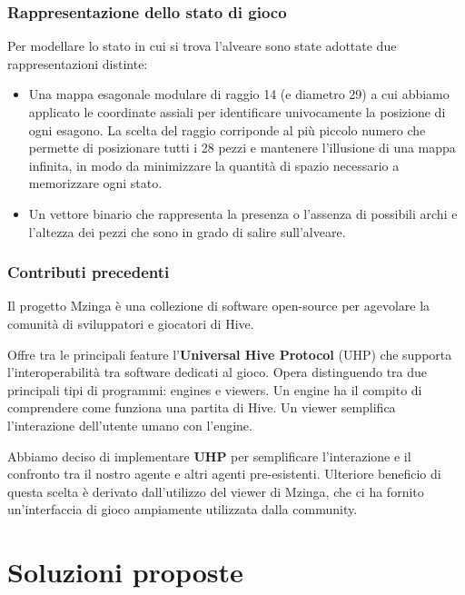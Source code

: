 \documentclass[a4paper,12pt]{article}
\begin{document}
    \newpage

    \subsubsection{Rappresentazione dello stato di gioco}
    Per modellare lo stato in cui si trova l'alveare sono state adottate due rappresentazioni distinte:
    \begin{itemize}
        \item Una mappa esagonale modulare di raggio 14 (e diametro 29) a cui abbiamo applicato le coordinate assiali per identificare univocamente la posizione di ogni esagono.
        La scelta del raggio corriponde al più piccolo numero che permette di posizionare tutti i 28 pezzi e mantenere l'illusione di una mappa infinita, in modo da minimizzare la quantità di spazio necessario a memorizzare ogni stato.

        \item Un vettore binario che rappresenta la presenza o l'assenza di possibili archi e l'altezza dei pezzi che sono in grado di salire sull'alveare.
    \end{itemize}

    \subsubsection{Contributi precedenti}
    Il progetto Mzinga \cite{mzinga} è una collezione di software open-source per agevolare la comunità di sviluppatori e giocatori di Hive.

    Offre tra le principali feature l'\textbf{Universal Hive Protocol} (UHP) che supporta l'interoperabilità tra software dedicati al gioco. Opera distinguendo tra due principali tipi di programmi: engines e viewers.
    Un engine ha il compito di comprendere come funziona una partita di Hive.
    Un viewer semplifica l'interazione dell'utente umano con l'engine.

    Abbiamo deciso di implementare \textbf{UHP} per semplificare l'interazione e il confronto tra il nostro agente e altri agenti pre-esistenti. Ulteriore beneficio di questa scelta è derivato dall'utilizzo del viewer di Mzinga, che ci ha fornito un'interfaccia di gioco ampiamente utilizzata dalla community.

    \newpage


    \section{Soluzioni proposte}
\end{document}
